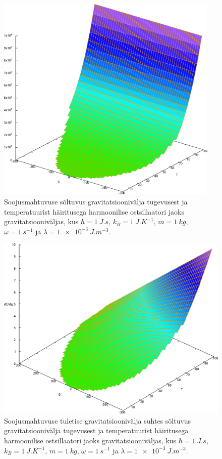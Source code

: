\documentclass{trkut}%
\begin{document}
\begin{figure}[htb!]
    \includegraphics[width=0.95\textwidth]{maxima/harh1k1m1w1l0001.pdf}
    \caption{Soojusmahtuvuse sõltuvus gravitatsioonivälja tugevusest ja temperatuurist häiritusega harmoonilise ostsillaatori jaoks gravitatsiooniväljas, kus $\hbar=\SI{1}{J.s}$, $k_B=\SI{1}{J.K^{-1}}$, $m=\SI{1}{kg}$, $\omega=\SI{1}{s^{-1}}$ ja $\lambda=\SI{1e-3}{J.m^{-3}}$.}
    \label{hjoon1}
\end{figure}

\begin{figure}[htb!]
    \includegraphics[width=\textwidth]{maxima/dcdgharh1k1m1w1l0001.pdf}
    \caption{Soojusmahtuvuse tuletise gravitatsioonivälja suhtes sõltuvus gravitatsioonivälja tugevusest ja temperatuurist häiritusega harmoonilise ostsillaatori jaoks gravitatsiooniväljas, kus $\hbar=\SI{1}{J.s}$, $k_B=\SI{1}{J.K^{-1}}$, $m=\SI{1}{kg}$, $\omega=\SI{1}{s^{-1}}$ ja $\lambda=\SI{1e-3}{J.m^{-3}}$.} %
    \label{hjoon2}
\end{figure}
\end{document}
